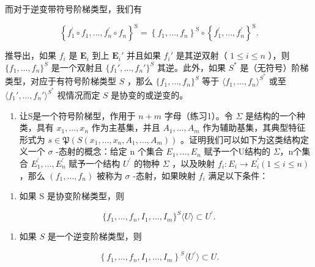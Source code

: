 而对于逆变带符号阶梯类型，我们有

\[
\left\{f _ {1} ^ {\prime} \circ f _ {1}, \dots , f _ {n} ^ {\prime} \circ f _ {n} \right\} ^ {\mathrm{S}} = \left\{f _ {1}, \dots , f _ {n} \right\} ^ {\mathrm{S}} \circ \left\{f _ {1} ^ {\prime}, \dots , f _ {n} ^ {\prime} \right\} ^ {\mathrm{S}}.
\]

推导出，如果 \(f_i\) 是 \(\mathbf{E}_i\) 到上 \(\mathbf{E}_i'\) 并且如果 \(f_i'\) 是其逆双射（ \(1 \leqslant i \leqslant n\) ），则 \(\{f_1, \ldots, f_n\}^S\) 是一个双射且 \(\{f_1', \ldots, f_n'\}^S\) 其逆。此外，如果 \(S^*\) 是（无符号）阶梯类型，对应于有符号阶梯类型 \(S\) ，那么 \(\{f_1, \ldots, f_n\}^S\) 等于 \(\langle f_1, \ldots, f_n \rangle^{S^*}\) 或至 \(\langle f_1', \ldots, f_n' \rangle^{S^*}\) 视情况而定 \(S\) 是协变的或逆变的。

\begin{enumerate}
\def\labelenumi{\arabic{enumi}.}
\setcounter{enumi}{1}
\tightlist
\item
  让S是一个符号阶梯型，作用于 \(n + m\) 字母（练习1）。令 \(\Sigma\) 是结构的一个种类，具有 \(x_{1}, \ldots, x_{n}\) 作为主基集，并且 \(A_{1}, \ldots, A_{m}\) 作为辅助基集，其典型特征形式为 \(s \in \mathfrak{P}(S(x_{1}, \ldots, x_{n}, A_{1}, \ldots, A_{m}))\) 。证明我们可以如下为这类结构定义一个 \(\sigma\) -态射的概念：给定 n 个集合 \(E_{1}, \ldots, E_{n}\) 赋予一个U结构的 \(\Sigma\)，n个集合 \(E_{1}^{\prime}, \ldots, E_{n}^{\prime}\) 赋予一个结构 \(U^{\prime}\) 的物种 \(\Sigma\) ，以及映射 \(f_{i}: E_{i} \to E_{i}^{\prime} (1 \leqslant i \leqslant n)\) ，那么 \((f_{1}, \ldots, f_{n})\) 被称为 \(\sigma\) -态射，如果映射 \(f_{i}\) 满足以下条件：
\end{enumerate}

\begin{enumerate}
\def\labelenumi{(\roman{enumi})}
\tightlist
\item
  如果 S 是协变阶梯类型，则
\end{enumerate}

\[
\{f _ {1}, \dots , f _ {n}, I _ {1}, \dots , I _ {m} \} ^ {S} \langle U \rangle \subset U ^ {\prime}.
\]

\begin{enumerate}
\def\labelenumi{(\roman{enumi})}
\setcounter{enumi}{1}
\tightlist
\item
  如果 \(S\) 是一个逆变阶梯类型，则
\end{enumerate}

\[
\left\{f _ {1}, \dots , f _ {n}, I _ {1}, \dots , I _ {m} \right\} ^ {S} \langle U ^ {\prime} \rangle \subset U.
\]


